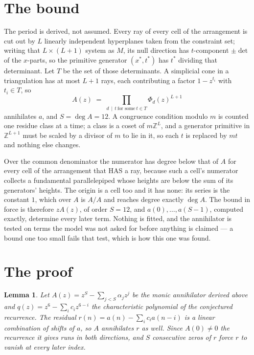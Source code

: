 \documentclass[11pt,a4paper]{article}
\theoremstyle{plain}
\newtheorem{lemma}[theorem]{Lemma}
\theoremstyle{definition}
\begin{document}
\section{The bound}

The period is derived, not assumed. Every ray of every cell of the arrangement is cut out by
$L$ linearly independent hyperplanes taken from the constraint set; writing that $L\times(L+1)$
system as $M$, its null direction has $t$-component $\pm\det$ of the $x$-parts, so the
primitive generator $(x^*,t^*)$ has $t^*$ dividing that determinant. Let $T$ be the set of
those determinants. A simplicial cone in a triangulation has at most $L+1$ rays, each
contributing a factor $1-z^{t_i}$ with $t_i\in T$, so
\[
A(z)\;=\;\prod_{d\,\mid\,t\ \text{for some}\ t\in T}\Phi_d(z)^{L+1}
\]
annihilates $a$, and $S=\deg A=12$. A congruence condition modulo $m$ is counted one residue
class at a time; a class is a coset of $m\mathbb{Z}^L$, and a generator primitive in
$\mathbb{Z}^{L+1}$ must be scaled by a divisor of $m$ to lie in it, so each $t$ is replaced
by $mt$ and nothing else changes.

Over the common denominator the numerator has degree below that of $A$ for every cell of the
arrangement that HAS a ray, because such a cell's numerator collects a fundamental
parallelepiped whose heights are below the sum of its generators' heights. The origin is a cell
too and it has none: its series is the constant $1$, which over $A$ is $A/A$ and reaches degree
exactly $\deg A$. The bound in force is therefore $zA(z)$, of order $S=12$, and
$a(0),\dots,a(S-1)$, computed exactly, determine every later term. Nothing is fitted, and the
annihilator is tested on terms the model was not asked for before anything is claimed --- a
bound one too small fails that test, which is how this one was found.

\section{The proof}

\begin{lemma}\label{lem:crit}
Let $A(z)=z^S-\sum_{j<S}\alpha_jz^{j}$ be the monic annihilator derived above and
$q(z)=z^{6}-\sum_ic_iz^{6-i}$ the characteristic polynomial of the conjectured
recurrence. The residual $r(n)=a(n)-\sum_ic_ia(n-i)$ is a linear combination of shifts of $a$,
so $A$ annihilates $r$ as well. Since $A(0)\ne0$ the recurrence it gives runs in both
directions, and $S$ consecutive zeros of $r$ force $r$ to vanish at every later index.
\end{lemma}
\end{document}
